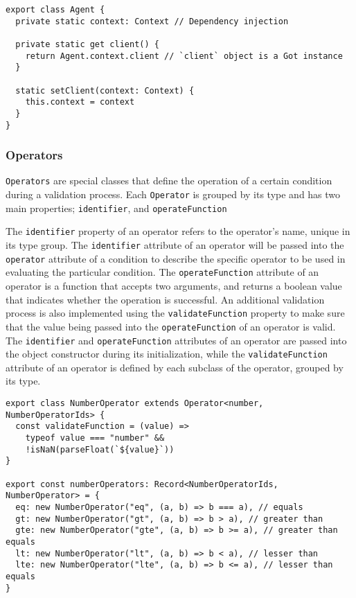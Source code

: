       \begin{lstlisting}[style=es6, caption={Usage of the singleton pattern and dependency injection in Agent class (TypeScript)}]
export class Agent {
  private static context: Context // Dependency injection

  private static get client() {
    return Agent.context.client // `client` object is a Got instance
  }

  static setClient(context: Context) {
    this.context = context
  }
}
      \end{lstlisting}

    \subsubsection{Operators}
      \label{impl_cl:op}

      \verb;Operators; are special classes that define the operation of a certain condition during a validation process. Each \verb;Operator; is grouped by its type and has two main properties; \verb;identifier;, and \verb;operateFunction;
      
      The \verb;identifier; property of an operator refers to the operator's name, unique in its type group. The \verb;identifier; attribute of an operator will be passed into the \verb;operator; attribute of a condition to describe the specific operator to be used in evaluating the particular condition. The \verb;operateFunction; attribute of an operator is a function that accepts two arguments, and returns a boolean value that indicates whether the operation is successful. An additional validation process is also implemented using the \verb;validateFunction; property to make sure that the value being passed into the \verb;operateFunction; of an operator is valid. The \verb;identifier; and \verb;operateFunction; attributes of an operator are passed into the object constructor during its initialization, while the \verb;validateFunction; attribute of an operator is defined by each subclass of the operator, grouped by its type.  
      
      \newpage
      \begin{lstlisting}[style=es6, caption={NumberOperator example (TypeScript)}]
export class NumberOperator extends Operator<number, NumberOperatorIds> {
  const validateFunction = (value) =>
    typeof value === "number" &&
    !isNaN(parseFloat(`${value}`))
}

export const numberOperators: Record<NumberOperatorIds, NumberOperator> = {
  eq: new NumberOperator("eq", (a, b) => b === a), // equals
  gt: new NumberOperator("gt", (a, b) => b > a), // greater than
  gte: new NumberOperator("gte", (a, b) => b >= a), // greater than equals
  lt: new NumberOperator("lt", (a, b) => b < a), // lesser than
  lte: new NumberOperator("lte", (a, b) => b <= a), // lesser than equals
} 
      \end{lstlisting}

